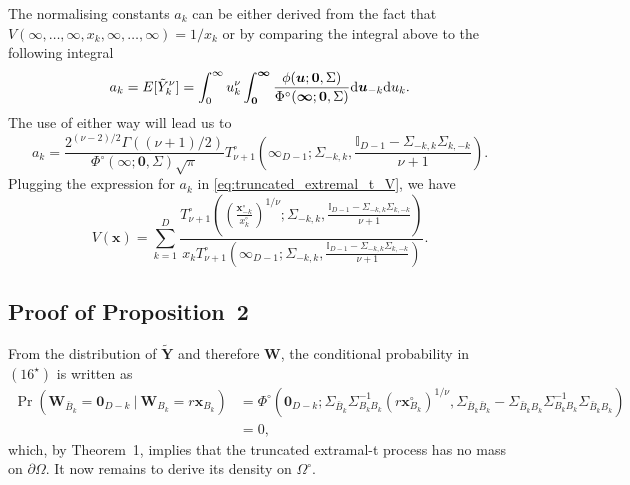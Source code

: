 \documentclass[12pt]{article}
\begin{document}
The normalising constants $a_k$ can be either derived from the fact that $V(\infty,\dots,\infty,x_k,\infty,\dots,\infty) = 1/x_k$ or by comparing the integral above to the following integral 
\begin{equation*}
\label{eq:normalising_trunc}
a_k = E[\tilde Y_k^\nu] = \int_0^\infty u_k^\nu \int_{\bm 0}^{\bm \infty} \frac{\phi(\bm u; \bm 0,\Sigma)}{\Phi^\circ(\bm \infty;\bm 0, \Sigma)}\text d \bm u_{-k}\text d u_k.	
\end{equation*}
The use of either way will lead us to 
\begin{equation*}
\label{eq:truncate_extremal_t_a}
a_k =\frac{2^{(\nu-2)/2}\Gamma((\nu+1)/2)}{\Phi^\circ(\bm \infty;\bm 0, \Sigma)\sqrt{\pi}} T_{\nu+1}^\circ\left(
\bm \infty_{D-1}
;\Sigma_{-k,k},\frac{\mathbb{I}_{D-1}-\Sigma_{-k,k}\Sigma_{k,-k}}{\nu+1}\right).
\end{equation*}
Plugging the expression for $a_k$ in \eqref{eq:truncated_extremal_t_V}, we have 
\begin{equation*}
V(\bm x) = \sum_{k=1}^D \frac{T_{\nu+1}^\circ\left( \left(\frac{\bm x_{-k}^\circ}{x_k^\circ}\right)^{1/\nu} ;\Sigma_{-k,k},\frac{\mathbb{I}_{D-1}-\Sigma_{-k,k}\Sigma_{k,-k}}{\nu+1}\right)}{x_k T_{\nu+1}^\circ\left(\bm \infty_{D-1};\Sigma_{-k,k},\frac{\mathbb{I}_{D-1}-\Sigma_{-k,k}\Sigma_{k,-k}}{\nu+1}\right)}.	
\end{equation*}

\subsection{Proof of Proposition~2}

From the distribution of $\tilde{\bm Y}$ and therefore $\bm W$, the conditional probability in $(16^\star)$ is written as
%
\begin{align*}
\Pr(\bm W_{\bar{B}_k} = \bm 0_{D-k} \ | \ \bm W_{B_k} = r \bm x_{B_k} )
& = \Phi^\circ \left( \bm 0_{D-k};
\Sigma_{\bar{B}_k}\Sigma_{B_k B_k}^{-1} \left(r \bm x_{B_k}^\circ\right)^{1/\nu},\Sigma_{\bar{B}_k\bar{B}_k}-\Sigma_{\bar{B}_k B_k}\Sigma_{B_k B_k}^{-1}\Sigma_{\bar{B}_k B_k} \right) \\
& = 0,
\end{align*}
%
which, by Theorem~1, implies that the truncated extramal-t process has no mass on $\partial\Omega$. It now remains to derive its density on $\Omega^\circ$. 
\end{document}
